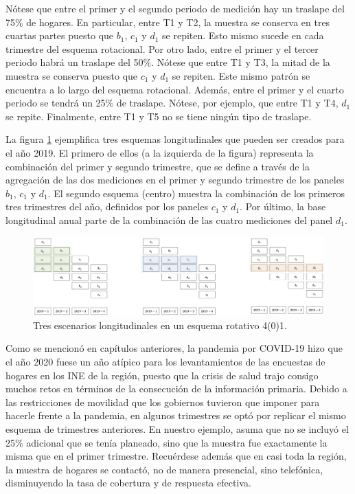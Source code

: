 \documentclass[
  12pt,
]{book}
\begin{document}
Nótese que entre el primer y el segundo periodo de medición hay un traslape del 75\% de hogares. En particular, entre T1 y T2, la muestra se conserva en tres cuartas partes puesto que \(b_1\), \(c_1\) y \(d_1\) se repiten. Esto mismo sucede en cada trimestre del esquema rotacional. Por otro lado, entre el primer y el tercer periodo habrá un traslape del 50\%. Nótese que entre T1 y T3, la mitad de la muestra se conserva puesto que \(c_1\) y \(d_1\) se repiten. Este mismo patrón se encuentra a lo largo del esquema rotacional. Además, entre el primer y el cuarto periodo se tendrá un 25\% de traslape. Nótese, por ejemplo, que entre T1 y T4, \(d_1\) se repite. Finalmente, entre T1 y T5 no se tiene ningún tipo de traslape.

La figura \ref{fig:figel1} ejemplifica tres esquemas longitudinales que pueden ser creados para el año 2019. El primero de ellos (a la izquierda de la figura) representa la combinación del primer y segundo trimestre, que se define a través de la agregación de las dos mediciones en el primer y segundo trimestre de los paneles \(b_1\), \(c_1\) y \(d_1\). El segundo esquema (centro) muestra la combinación de los primeros tres trimestres del año, definidos por los paneles \(c_1\) y \(d_1\). Por último, la base longitudinal anual parte de la combinación de las cuatro mediciones del panel \(d_1\).

\begin{figure}
\includegraphics[width=0.5\linewidth]{Pics/el1} \caption{Tres escenarios longitudinales en un esquema rotativo 4(0)1.}\label{fig:figel1}
\end{figure}

Como se mencionó en capítulos anteriores, la pandemia por COVID-19 hizo que el año 2020 fuese un año atípico para los levantamientos de las encuestas de hogares en los INE de la región, puesto que la crisis de salud trajo consigo muchos retos en términos de la consecución de la información primaria. Debido a las restricciones de movilidad que los gobiernos tuvieron que imponer para hacerle frente a la pandemia, en algunos trimestres se optó por replicar el mismo esquema de trimestres anteriores. En nuestro ejemplo, asuma que no se incluyó el 25\% adicional que se tenía planeado, sino que la muestra fue exactamente la misma que en el primer trimestre. Recuérdese además que en casi toda la región, la muestra de hogares se contactó, no de manera presencial, sino telefónica, disminuyendo la tasa de cobertura y de respuesta efectiva.
\end{document}
